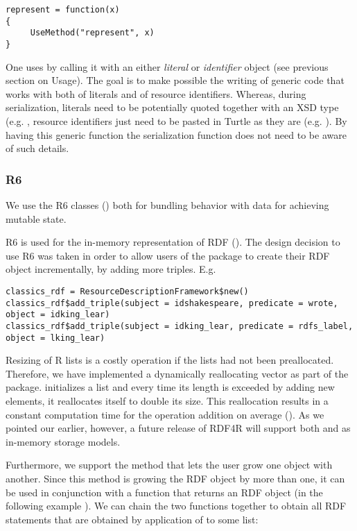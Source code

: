 \begin{lstlisting}[style=customr]
represent = function(x)
{
     UseMethod("represent", x)
}
\end{lstlisting}

One uses  by calling it with an either \emph{literal} or \emph{identifier} object (see previous section on Usage). The goal is to make possible the writing of generic code that works with both of literals and of resource identifiers. Whereas, during serialization, literals need to be potentially quoted together with an XSD type (e.g. , resource identifiers just need to be pasted in Turtle as they are (e.g. ). By having this generic function the serialization function does not need to be aware of such details.

\subsubsection{R6}

We use the R6 classes (\cite{chang_r6:_2017}) both for bundling behavior with data for achieving mutable state.

R6 is used for the in-memory representation of RDF (). The design decision to use R6 was taken in order to allow users of the package to create their RDF object incrementally, by adding more triples. E.g.

\begin{lstlisting}[style=customr]
classics_rdf = ResourceDescriptionFramework$new()
classics_rdf$add_triple(subject = idshakespeare, predicate = wrote, object = idking_lear)
classics_rdf$add_triple(subject = idking_lear, predicate = rdfs_label, object = lking_lear)
\end{lstlisting}

Resizing of R lists is a costly operation if the lists had not been preallocated. Therefore, we have implemented a dynamically reallocating vector  as part of the package.  initializes a list and every time its length is exceeded by adding new elements, it reallocates itself to double its size. This reallocation results in a constant computation time for the operation addition on average (\cite{harrington_amortizing_2018}). As we pointed our earlier, however, a future release of RDF4R will support both  and  as in-memory storage models.

Furthermore, we support the  method that lets the user grow one  object with another. Since this method is growing the RDF object by more than one, it can be used in conjunction with a function that returns an RDF object (in the following example ). We can chain the two functions together to obtain all RDF statements that are obtained by application of  to some list:

